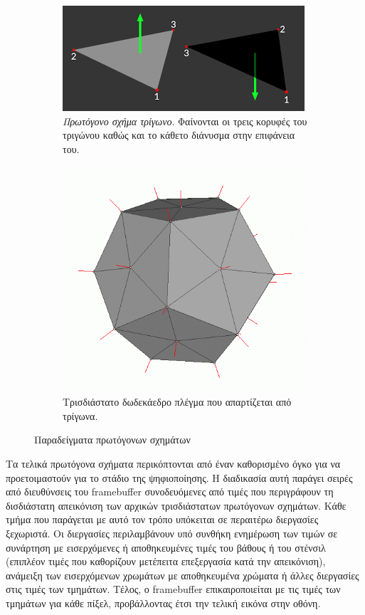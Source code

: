 \begin{figure}[h]
	\centering
	\begin{subfigure}{.4\textwidth}
		\label{figure:triangle_polyhedron_mesh}
		\includegraphics[width=.4\linewidth]{images/chapter2/triangle_normal.png}
		\caption[Πρωτόγονο σχήμα τρίγωνο]{\textsl{Πρωτόγονο σχήμα τρίγωνο}. Φαίνονται οι τρεις κορυφές του τριγώνου καθώς και το κάθετο διάνυσμα στην επιφάνεια του.}
	\end{subfigure}%
	\begin{subfigure}{.4\textwidth}
		\label{figure:dodecahedron}
		\includegraphics[width=.4\linewidth]{images/appendix/vertex_normal.png}
		\caption[Τρισδιάστατο δωδεκάεδρο πλέγμα]{Τρισδιάστατο δωδεκάεδρο πλέγμα που απαρτίζεται από τρίγωνα.}
	\end{subfigure}
	\caption{Παραδείγματα πρωτόγονων σχημάτων}
\end{figure}


Τα τελικά πρωτόγονα σχήματα περικόπτονται από έναν καθορισμένο όγκο για να προετοιμαστούν για το στάδιο της ψηφιοποίησης. Η διαδικασία αυτή παράγει σειρές από διευθύνσεις του framebuffer συνοδευόμενες από τιμές που περιγράφουν τη δισδιάστατη απεικόνιση των αρχικών τρισδιάστατων πρωτόγονων σχημάτων. Κάθε τμήμα που παράγεται με αυτό τον τρόπο υπόκειται σε περαιτέρω διεργασίες ξεχωριστά. Οι διεργασίες περιλαμβάνουν υπό συνθήκη ενημέρωση των τιμών σε συνάρτηση με εισερχόμενες ή αποθηκευμένες τιμές του βάθους ή του στένσιλ (επιπλέον τιμές που καθορίζουν μετέπειτα επεξεργασία κατά την απεικόνιση), ανάμειξη των εισερχόμενων χρωμάτων με αποθηκευμένα χρώματα ή άλλες διεργασίες στις τιμές των τμημάτων. Τέλος, ο framebuffer επικαιροποιείται με τις τιμές των τμημάτων για κάθε πίξελ, προβάλλοντας έτσι την τελική εικόνα στην οθόνη.